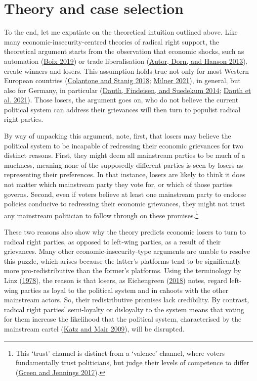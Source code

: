 \documentclass[
]{article}
\begin{document}
\hypertarget{theory}{%
\section{Theory and case selection}\label{theory}}

To the end, let me expatiate on the theoretical intuition outlined
above. Like many economic-insecurity-centred theories of radical right
support, the theoretical argument starts from the observation that
economic shocks, such as automation
(\protect\hyperlink{ref-boix_democratic_2019}{Boix 2019}) or trade
liberalisation (\protect\hyperlink{ref-autor_china_2013}{Autor, Dorn,
and Hanson 2013}), create winners and losers. This assumption holds true
not only for most Western European countries
(\protect\hyperlink{ref-colantone_trade_2018}{Colantone and Stanig
2018}; \protect\hyperlink{ref-milner_voting_2021}{Milner 2021}), in
general, but also for Germany, in particular
(\protect\hyperlink{ref-dauth_rise_2014}{Dauth, Findeisen, and Suedekum
2014}; \protect\hyperlink{ref-dauth_adjustment_2021}{Dauth et al.
2021}). Those losers, the argument goes on, who do not believe the
current political system can address their grievances will then turn to
populist radical right parties.

By way of unpacking this argument, note, first, that losers may believe
the political system to be incapable of redressing their economic
grievances for two distinct reasons. First, they might deem all
mainstream parties to be much of a muchness, meaning none of the
supposedly different parties is seen by losers as representing their
preferences. In that instance, losers are likely to think it does not
matter which mainstream party they vote for, or which of those parties
governs. Second, even if voters believe at least one mainstream party to
endorse policies conducive to redressing their economic grievances, they
might not trust any mainstream politician to follow through on these
promises.\footnote{This `trust' channel is distinct from a `valence'
  channel, where voters fundamentally trust politicians, but judge their
  levels of competence to differ
  (\protect\hyperlink{ref-green_politics_2017}{Green and Jennings
  2017}).}

These two reasons also show why the theory predicts economic losers to
turn to radical right parties, as opposed to left-wing parties, as a
result of their grievances. Many other economic-insecurity-type
arguments are unable to resolve this puzzle, which arises because the
latter's platforms tend to be significantly more pro-redistributive than
the former's platforms. Using the terminology by Linz
(\protect\hyperlink{ref-linz_breakdown_1978}{1978}), the reason is that
losers, as Eichengreen
(\protect\hyperlink{ref-eichengreen_populist_2018}{2018}) notes, regard
left-wing parties as loyal to the political system and in cahoots with
the other mainstream actors. So, their redistributive promises lack
credibility. By contrast, radical right parties' semi-loyalty or
disloyalty to the system means that voting for them increase the
likelihood that the political system, characterised by the mainstream
cartel (\protect\hyperlink{ref-katz_cartel_2009}{Katz and Mair 2009}),
will be disrupted.
\end{document}
